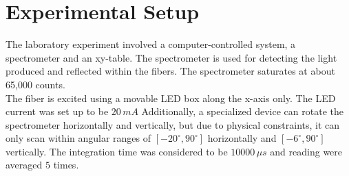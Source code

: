
\chapter{Experimental Setup}\label{ch2}
    The laboratory experiment involved a computer-controlled system, a spectrometer and an xy-table. The spectrometer is used for detecting the light produced and reflected within the fibers. The spectrometer saturates at about 65,000 counts.\\
    
    The fiber is excited using a movable LED box along the x-axis only. The LED current was set up to be $20 \,mA$ Additionally, a specialized device can rotate the spectrometer horizontally and vertically, but due to physical constraints, it can only scan within angular ranges of $[-20^\circ, 90^\circ]$ horizontally and $[-6^\circ, 90^\circ]$ vertically. The integration time was considered to be $10000 \,\mu s$ and reading were averaged $5$ times.\\